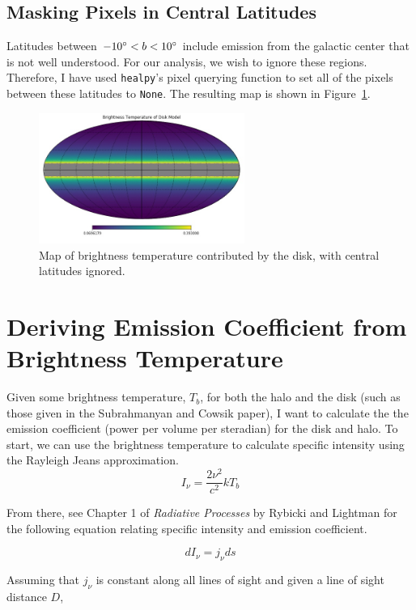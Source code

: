 \documentclass[letterpaper, 10pt]{article}
\begin{document}
 
\subsection{Masking Pixels in Central Latitudes}

Latitudes between $ -10\degree < b < 10\degree$ include emission from the galactic center that is not well understood. For our analysis, we wish to ignore these regions. Therefore, I have used \texttt{healpy}'s pixel querying function to set all of the pixels between these latitudes to \texttt{None}. The resulting map is shown in Figure~\ref{disk_mod}.

\begin{figure}[h]
\begin{center}
\includegraphics[width=0.6\textwidth]{disk_mod.jpg}
\caption{Map of brightness temperature contributed by the disk, with central latitudes ignored.}
\label{disk_mod}
\end{center}
\end{figure}


\section{Deriving Emission Coefficient from Brightness Temperature}
Given some brightness temperature, $T_{b}$, for both the halo and the disk (such as those given in the Subrahmanyan and Cowsik paper), I want to calculate the the emission coefficient (power per volume per steradian) for the disk and halo. To start, we can use the brightness temperature to calculate specific intensity using the Rayleigh Jeans approximation. 
\[ I_{\nu} = \frac{2\nu^{2}}{c^{2}}kT_{b} \]

From there, see Chapter 1 of \emph{Radiative Processes} by Rybicki and Lightman for the following equation relating specific intensity and emission coefficient. 

\[ dI_{\nu} = j_{\nu}ds  \]

Assuming that $j_{\nu}$ is constant along all lines of sight and given a line of sight distance $D$, 
\end{document}

